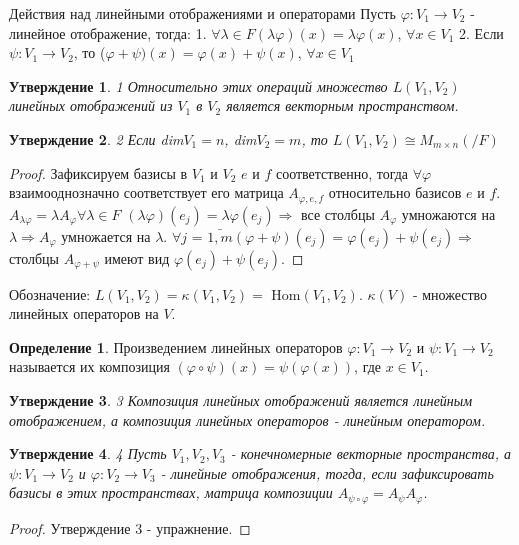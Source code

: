 \documentclass[a4paper, 12pt]{article}
\renewcommand{\phi}{\varphi}
\theoremstyle{definition}
\newtheorem*{definition}{Определение}
\theoremstyle{plain}
\newtheorem*{subtheorem}{Утверждение}
\theoremstyle{remark}
\begin{document}
  \begin{subsection} Действия над линейными отображениями и операторами
    Пусть $\phi: V_1 \to V_2$ - линейное отображение, тогда:
    1. $\forall \lambda \in F (\lambda\phi)(x) = \lambda\phi(x)$, $\forall x \in V_1$
    2. Если $\psi: V_1 \to V_2$, то ($\phi+\psi)(x) = \phi(x)+\psi(x)$, $\forall x \in V_1$
    \begin{subtheorem} 1
      Относительно этих операций множество $L(V_1, V_2)$ линейных отображений из $V_1$ в $V_2$ является векторным пространством.
    \end{subtheorem}
    \begin{subtheorem} 2
      Если dim$V_1 = n$, dim$V_2 = m$, то $L(V_1, V_2) \cong M_{m \times n}(/F)$
    \end{subtheorem}
    \begin{proof}
      Зафиксируем базисы в $V_1$ и $V_2$ $e$ и $f$ соответственно, тогда $\forall \phi$ взаимооднозначно соответствует его матрица $A_{\phi, e, f}$ относительно базисов $e$ и $f$.
      $A_{\lambda \phi} = \lambda A_{\phi} \forall \lambda \in F$
      $(\lambda \phi)(e_j) = \lambda \phi(e_j) \Longrightarrow$ все столбцы $A_{\phi}$ умножаются на $\lambda \Longrightarrow A_{\phi}$ умножается на $\lambda$.
      $\forall j$ = $\bar{1, m} (\phi + \psi)(e_j) = \phi(e_j) + \psi(e_j) \Longrightarrow$ столбцы $A_{\phi + \psi}$ имеют вид $\phi(e_j) + \psi(e_j)$.
    \end{proof}
    Обозначение: $L(V_1, V_2) = \kappa(V_1, V_2) =$ Hom$(V_1, V_2)$.
    $\kappa(V)$ - множество линейных операторов на $V$.
    \begin{definition}
      Произведением линейных операторов $\phi: V_1 \to V_2$ и $\psi: V_1 \to V_2$ называется их композиция $(\phi\circ\psi)(x) = \psi(\phi(x))$, где $x \in V_1$.
    \end{definition}
    \begin{subtheorem} 3
      Композиция линейных отображений является линейным отображением, а композиция линейных операторов - линейным оператором.
    \end{subtheorem}
    \begin{subtheorem} 4
      Пусть $V_1, V_2, V_3$ - конечномерные векторные пространства, а $\psi: V_1 \to V_2$ и $\phi: V_2 \to V_3$ - линейные отображения, тогда, если зафиксировать базисы в этих пространствах, матрица композиции $A_{\psi\circ\phi} = A_{\psi} A_{\phi}$.
    \end{subtheorem}
    \begin{proof}
      Утверждение 3 - упражнение.

\end{proof}
\end{subsection}
\end{document}
